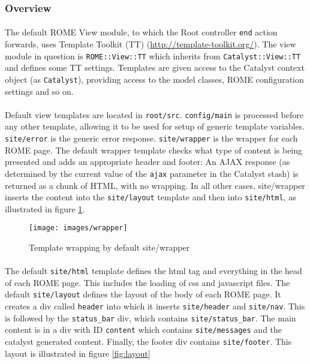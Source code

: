 \subsubsection{Overview}
\label{sec:view_overview}

\paragraph{}
The default ROME View module, to which the Root controller \texttt{end} action forwards, uses Template Toolkit (TT) (\url{http://template-toolkit.org/}). The view module in question is \texttt{ROME::View::TT} which inherits from \texttt{Catalyst::View::TT} and defines some TT settings. Templates are given access to the Catalyst context object (as \texttt{Catalyst}), providing access to the model classes, ROME configuration settings and so on. 

\paragraph{}
Default view templates are located in \texttt{root/src}.  \texttt{config/main} is processed before any other template, allowing it to be used for setup of generic template variables. \texttt{site/error} is the generic error response. \texttt{site/wrapper} is the wrapper for each ROME page. The default wrapper template checks what type of content is being presented and adds an appropriate header and footer: An AJAX response (as determined by the current value of the \texttt{ajax} parameter in the Catalyst stash) is returned as a chunk of HTML, with no wrapping. In all other cases, site/wrapper inserts the content into the \texttt{site/layout} template and then into \texttt{site/html}, as illustrated in figure \ref{fig:wrapper}. 

\begin{figure}
\centering
\caption{Template wrapping by default site/wrapper}\label{fig:wrapper}
\texttt{[image: images/wrapper]}
\end{figure}

\paragraph{}
The default \texttt{site/html} template defines the html tag and everything in the head of each ROME page. This includes the loading of css and javascript files.
The default \texttt{site/layout} defines the layout of the body of each ROME page. It creates a div called \texttt{header} into which it inserts \texttt{site/header} and \texttt{site/nav}. This is followed by the \texttt{status\_bar} div, which contains \texttt{site/status\_bar}. The main content is in a div with ID \texttt{content} which contains \texttt{site/messages} and the catalyst generated content. Finally, the footer div contains \texttt{site/footer}. This layout is illustrated in figure \ref{fig:layout}

